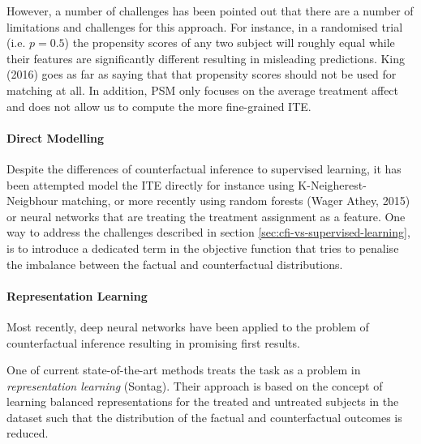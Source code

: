 
However, a number of challenges has been pointed out that there are a number of limitations and challenges for this approach. For instance, in a randomised trial (i.e. $p =0.5$) the propensity scores of any two subject will roughly equal while their features are significantly different resulting in misleading predictions. King (2016) %
goes as far as saying that that propensity scores should not be used for matching at all. In addition, PSM only focuses on the average treatment affect and does not allow us to compute the more fine-grained ITE. 


%

\paragraph{Direct Modelling}
Despite the differences of counterfactual inference to supervised learning, it has been attempted model the ITE directly for instance using K-Neigherest-Neigbhour matching, or more recently using random forests (Wager  Athey, 2015) or neural networks that are treating the treatment assignment as a feature. %
One way to address the challenges described in section \ref{sec:cfi-vs-supervised-learning}, is to introduce a dedicated term in the objective function that tries to penalise the imbalance between the factual and counterfactual distributions.  


\paragraph{Representation Learning} \label{sec:representation-learning}
Most recently, deep neural networks have been applied to the problem of counterfactual inference resulting in promising first results. 

One of current state-of-the-art methods treats the task as a problem in \emph{representation learning} (Sontag). %
Their approach is based on the concept of learning balanced representations for the treated and untreated subjects in the dataset such that the distribution of the factual and counterfactual outcomes is reduced. 

